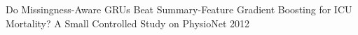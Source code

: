Do Missingness-Aware GRUs Beat Summary-Feature Gradient Boosting for ICU Mortality? A Small Controlled Study on PhysioNet 2012
